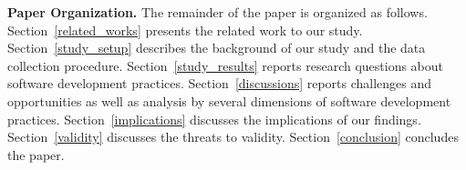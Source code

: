 \noindent\textbf{Paper Organization.} The remainder of the paper is organized as follows. Section~\ref{related_works} presents the related work to our study. Section~\ref{study_setup} describes the background of our study and the data collection procedure. Section~\ref{study_results} reports research questions about software development practices. Section~\ref{discussions} reports challenges and opportunities as well as analysis by several dimensions of software development practices. Section~\ref{implications} discusses the implications of our findings. Section~\ref{validity} discusses the threats to validity. Section~\ref{conclusion} concludes the paper.
